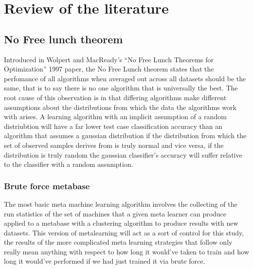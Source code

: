 \chapter{Review of the literature}
\label{Chapter2}
\section{No Free lunch theorem}
Introduced in Wolpert and MacReady's ``No Free Lunch Theorems for Optimization'' 1997 paper,
the No Free Lunch theorem states that the perfomance of all algorithms when averaged out across all
datasets should be the same, that is to say there is no one algorithm that is universally the best.
The root cause of this observation is in that differing algorithms make different assumptions about the
distributions from which the data the algorithms work with arises. A learning algorithm with an implicit
assumption of a random distriubtion will have a far lower test case classification accuracy than an
algorithm that assumes a gaussian distribution if the distribution from which the set of observed
samples derives from is truly normal and vice versa, if the distribution is truly random the gaussian
classifier's accuracy will suffer relative to the classifier with a random assumption.
\subsection{Brute force metabase}
The most basic meta machine learning algorithm involves the collecting of the run statistics
of the set of machines that a given meta learner can produce applied to a metabase with a clustering
algorithm to produce results with new datasets. This version of metalearning will act as a sort of control
for this study, the results of the more complicated meta learning strategies that follow only really mean
anything with respect to how long it would've taken to train and how long it would've performed if we had
just trained it via brute force.
